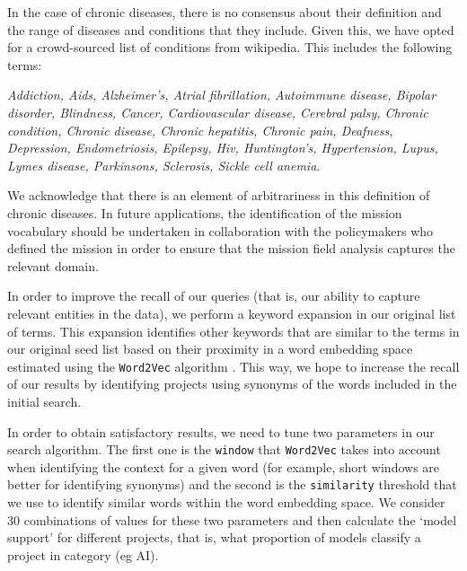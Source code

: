 \documentclass[11pt]{article}
\begin{document}
In the case of chronic diseases, there is no consensus about their definition and the range of diseases and conditions that they include. Given this, we have opted for a crowd-sourced list of conditions from wikipedia. This includes the following terms: 

\emph{Addiction, Aids, Alzheimer’s, Atrial fibrillation, Autoimmune disease, Bipolar disorder, Blindness, Cancer, Cardiovascular disease, Cerebral palsy, Chronic condition, Chronic disease, Chronic hepatitis, Chronic pain, Deafness, Depression, Endometriosis, Epilepsy, Hiv, Huntington’s, Hypertension, Lupus, Lymes disease, Parkinsons, Sclerosis, Sickle cell anemia}.

We acknowledge that there is an element of arbitrariness in this definition of chronic diseases. In future applications, the identification of the mission vocabulary should be undertaken in collaboration with the policymakers who defined the mission in order to ensure that the mission field analysis captures the relevant domain.

In order to improve the recall of our queries (that is, our ability to capture relevant entities in the data), we perform a keyword expansion in our original list of terms. This expansion identifies other keywords that are similar to the terms in our original seed list based on their proximity in a word embedding space estimated using the \texttt{Word2Vec} algorithm \citep{mikolov_linguistic_2013}. This way, we hope to increase the recall of our results by identifying projects using synonyms of the words included in the initial search.

In order to obtain satisfactory results, we need to tune two parameters in our search algorithm. The first one is the \texttt{window} that \texttt{Word2Vec} takes into account when identifying the context for a given word (for example, short windows are better for identifying synonyms) and the second is the \texttt{similarity} threshold that we use to identify similar words within the word embedding space. We consider 30 combinations of values for these two parameters and then calculate the `model support' for different projects, that is, what proportion of models classify a project in category (eg AI). 
\end{document}
